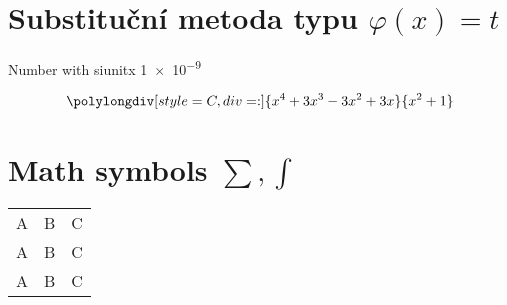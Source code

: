 \documentclass[10pt]{scrbook}
\begin{document}
\section{Substituční metoda typu  \texorpdfstring{\(\varphi(x) = t\)}{phi(x) = t}}\label{mai:IchapVIIsecIIIssecIII} 
Number with siunitx \num{1e-9}

\begin{equation*}
  \polylongdiv[style=C,div=:]{x^4+3x^3-3x^2+3x}{x^2+1}
\end{equation*}

\section[\texorpdfstring{Math symbols $\sum, \int$}%
                        {Math symbols \sum, \int}]%
        {Math symbols $\bm{\sum, \int}$}  %

\begin{tabular}{ccc}
A & B & C \\
\cmidrule{2-3}
A & B & C \\
\cline{1-2}
A & B & C \\
\end{tabular}
\end{document}
